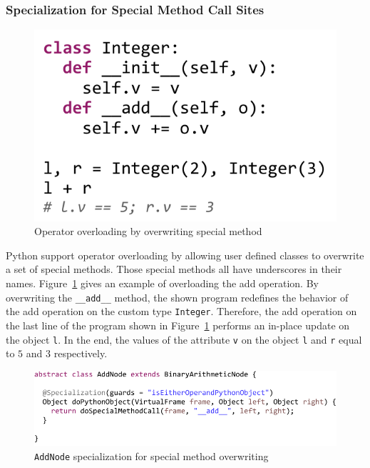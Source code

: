 \subsubsection{Specialization for Special Method Call Sites}

\begin{figure}
\centering
\includegraphics[scale=.7]{figures/ch5-special-method-add-code}
\caption{Operator overloading by overwriting special method}
\label{fig:ch5-special-method-add-code}
\end{figure}

Python support operator overloading by allowing user defined classes to overwrite a set of special methods.
Those special methods all have underscores in their names.
Figure~\ref{fig:ch5-special-method-add-code} gives an example of overloading the add operation.
By overwriting the \texttt{\_\_add\_\_} method, the shown program redefines the behavior of the add operation on the custom type \texttt{Integer}.
Therefore, the add operation on the last line of the program shown in Figure~\ref{fig:ch5-special-method-add-code} performs an in-place update on the object \texttt{l}.
In the end, the values of the attribute \texttt{v} on the object \texttt{l} and \texttt{r} equal to $5$ and $3$ respectively.

\begin{figure}
\centering
\includegraphics[scale=1.]{figures/ch5-add-node-special-method-code}
\caption{\texttt{AddNode} specialization for special method overwriting}
\label{fig:ch5-add-node-special-method-code}
\end{figure}

